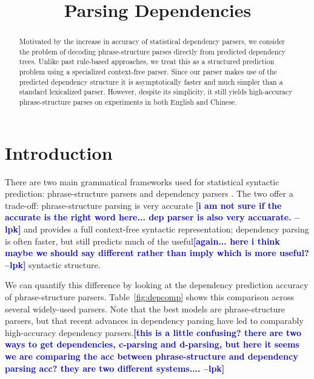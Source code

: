 \documentclass[11pt,letterpaper]{article}
\title{Parsing Dependencies}
\author{}
\date{}
\newcommand{\lpkcomment}[1]{\textcolor{blue}{\bf \small [#1 --lpk]}}
\begin{document}
\maketitle
\begin{abstract}

  Motivated by the increase in accuracy of statistical dependency
  parsers, we consider the problem of decoding phrase-structure parses
  directly from predicted dependency trees. Unlike past rule-based
  approaches, we treat this as a structured prediction problem using a
  specialized context-free parser. Since our parser makes use of the
  predicted dependency structure it is asymptotically faster and much
  simpler than a standard lexicalized parser. However, despite its
  simplicity, it still yields high-accuracy phrase-structure parses on
  experiments in both English and Chinese.



\end{abstract}



\section{Introduction}



There are two main grammatical
frameworks used for statistical syntactic prediction: phrase-structure parsers and
dependency parsers \cite{}. The two offer a
trade-off: phrase-structure parsing is very accurate \lpkcomment{i am not sure if the accurate is the right word here... dep parser is also very accuarate.} and provides a
full context-free syntactic representation; dependency parsing is
often faster, but still
predicts much of the useful\lpkcomment{again... here i think maybe we should say different rather than imply which is more useful?} syntactic structure.

We can quantify this difference by looking
at the dependency prediction accuracy of phrase-structure parsers. Table~\ref{fig:depcomp} shows this comparison across several widely-used parsers. Note that the best models are phrase-structure parsers, but that recent advances in dependency parsing have led to comparably high-accuracy dependency parsers.\lpkcomment{this is a little confusing? there are two ways to get dependencies, c-parsing and d-parsing, but here it seems we are comparing the acc between phrase-structure and dependency parsing acc? they are two different systems....}
\end{document}

